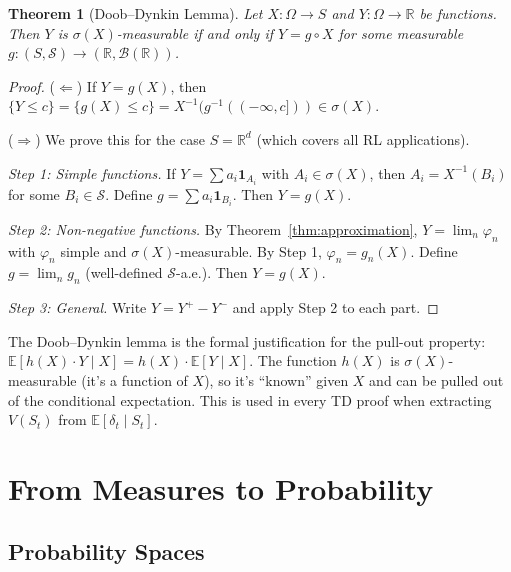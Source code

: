 \documentclass[11pt,a4paper]{article}
\theoremstyle{definition}
\theoremstyle{plain}
\newtheorem{theorem}{Theorem}[section]
\theoremstyle{remark}
\newcommand{\R}{\mathbb{R}}
\newcommand{\E}{\mathbb{E}}
\newcommand{\indicator}{\mathbf{1}}
\newcommand{\Borel}{\mathcal{B}}
\begin{document}
\begin{theorem}[Doob--Dynkin Lemma]
\label{thm:doob_dynkin}
Let $X: \Omega \to S$ and $Y: \Omega \to \R$ be functions. Then $Y$ is
$\sigma(X)$-measurable if and only if $Y = g \circ X$ for some measurable
$g: (S, \mathcal{S}) \to (\R, \Borel(\R))$.
\end{theorem}

\begin{proof}
($\Leftarrow$) If $Y = g(X)$, then $\{Y \leq c\} = \{g(X) \leq c\} = X^{-1}(g^{-1}((-\infty, c])) \in \sigma(X)$.

($\Rightarrow$) We prove this for the case $S = \R^d$ (which covers all RL applications).

\textit{Step 1: Simple functions.} If $Y = \sum a_i \indicator_{A_i}$ with $A_i \in \sigma(X)$, then $A_i = X^{-1}(B_i)$ for some $B_i \in \mathcal{S}$. Define $g = \sum a_i \indicator_{B_i}$. Then $Y = g(X)$.

\textit{Step 2: Non-negative functions.} By Theorem~\ref{thm:approximation}, $Y = \lim_n \varphi_n$ with $\varphi_n$ simple and $\sigma(X)$-measurable. By Step 1, $\varphi_n = g_n(X)$. Define $g = \lim_n g_n$ (well-defined $\mathcal{S}$-a.e.). Then $Y = g(X)$.

\textit{Step 3: General.} Write $Y = Y^+ - Y^-$ and apply Step 2 to each part.
\end{proof}

\begin{rlconnection}[Connection to RL]
The Doob--Dynkin lemma is the formal justification for the pull-out property:
$\E[h(X) \cdot Y \mid X] = h(X) \cdot \E[Y \mid X]$. The function $h(X)$ is
$\sigma(X)$-measurable (it's a function of $X$), so it's ``known'' given $X$
and can be pulled out of the conditional expectation. This is used in every
TD proof when extracting $V(S_t)$ from $\E[\delta_t \mid S_t]$.
\end{rlconnection}

\section{From Measures to Probability}
\label{sec:probability}

\subsection{Probability Spaces}
\label{subsec:prob_spaces}
\end{document}
